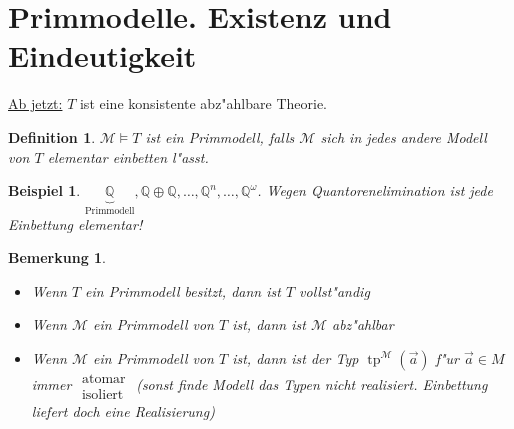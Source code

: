 \documentclass[a4paper,12pt,numbers=noenddot,parskip=full]{scrartcl}
\newcommand{\setQ}{\mathbb{Q}}
\newcommand{\scrM}{\mathcal{M}}
\newcommand{\heading}{\underline}
\DeclareMathOperator{\typ}{tp}
\theoremstyle{dotless}
\newtheorem{definition}[theorem]{Definition}
\newtheorem{example}[theorem]{Beispiel}
\newtheorem{remark}[theorem]{Bemerkung}
\begin{document}
\section{Primmodelle. Existenz und Eindeutigkeit}
\heading{Ab jetzt:} $T$ ist eine konsistente abz"ahlbare Theorie.
\begin{definition}
	$\scrM \models T$ ist ein \emph{Primmodell}, falls $\scrM$ sich in jedes andere Modell von $T$ elementar einbetten l"asst.
\end{definition}
\begin{example}
	$\underbrace{\setQ}_\text{Primmodell} , \setQ \oplus \setQ , \dots, \setQ^n , \dots, \setQ^\omega$. Wegen Quantorenelimination ist jede Einbettung elementar!
\end{example}
\begin{remark}
	\begin{itemize}
		\item Wenn $T$ ein Primmodell besitzt, dann ist $T$ vollst"andig
		\item Wenn $\scrM$ ein Primmodell von $T$ ist, dann ist $\scrM$ abz"ahlbar
		\item Wenn $\scrM$ ein Primmodell von $T$ ist, dann ist der Typ $\typ^\scrM(\vec{a})$ f"ur $\vec{a} \in M$ immer $\begin{array}{c}
			\text{atomar}\\\text{isoliert}
		\end{array}$ (sonst finde Modell das Typen nicht realisiert. Einbettung liefert doch eine Realisierung)
	\end{itemize}
\end{remark}
\end{document}
